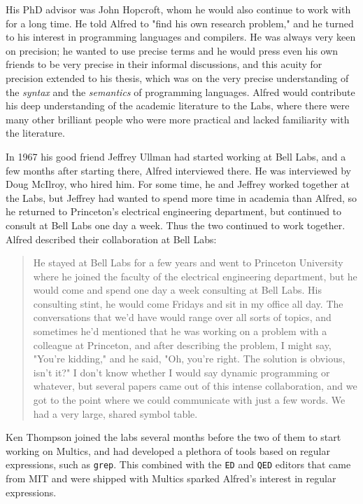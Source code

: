 His PhD advisor was John Hopcroft, whom he would also continue to work with for a long time.
He told Alfred to "find his own research problem," and he turned to his interest in
programming languages and compilers.
He was always very keen on precision; he wanted to use precise terms and he would
press even his own friends to be very precise in their informal discussions, and
this acuity for precision extended to his thesis, which was on the very precise
understanding of the \textit{syntax} and the \textit{semantics} of programming languages.
Alfred would contribute his deep understanding of the academic literature
to the Labs, where there were many other brilliant people who were more practical
and lacked familiarity with the literature.

In 1967 his good friend Jeffrey Ullman had started working at Bell Labs, and a few months
after starting there, Alfred interviewed there.
He was interviewed by Doug McIlroy, who hired him.
For some time, he and Jeffrey worked together at the Labs, but Jeffrey had wanted to
spend more time in academia than Alfred, so he returned to Princeton's electrical
engineering department, but continued to consult at Bell Labs one day a week.
Thus the two continued to work together.
Alfred described their collaboration at Bell Labs:

\begin{quotation}
He stayed at Bell Labs for a few years and went to Princeton University where he 
joined the faculty of the electrical engineering department, but he would come and spend one day a 
week consulting at Bell Labs. His consulting stint, he would come Fridays and sit in my office 
all day. The conversations that we'd have would range over all sorts of topics, and sometimes he'd 
mentioned that he was working on a problem with a colleague at Princeton, and after describing the 
problem, I might say, "You're kidding," and he said, "Oh, you're right. The solution is obvious, 
isn't it?" I don't know whether I would say dynamic programming or whatever, but several papers 
came out of this intense collaboration, and we got to the point where we could communicate with just 
a few words. We had a very large, shared symbol table.
\cite{aho_oral_history_2022}
\end{quotation}

Ken Thompson joined the labs several months before the two of them to
start working on Multics, and had developed a plethora of tools based on
regular expressions, such as \texttt{grep}.
This combined with the \texttt{ED} and \texttt{QED} editors that came from MIT
and were shipped with Multics sparked Alfred's interest in regular expressions.

